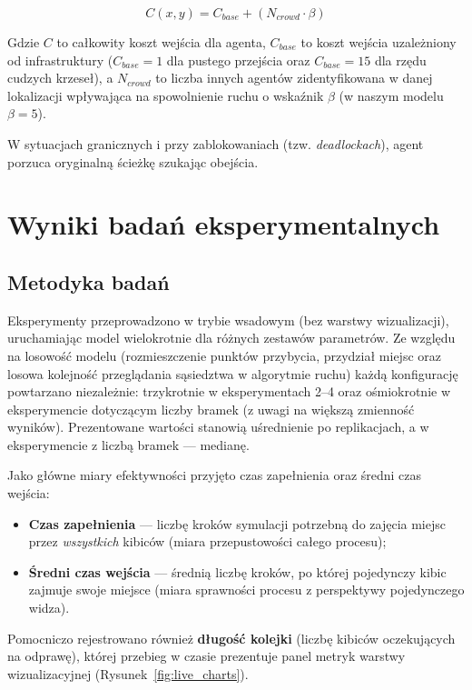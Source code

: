 \documentclass[polish]{projectreport}
\begin{document}
\begin{equation}
    C(x,y) = C_{base} + (N_{crowd} \cdot \beta)
\end{equation}

Gdzie $C$ to całkowity koszt wejścia dla agenta, $C_{base}$ to koszt wejścia uzależniony od infrastruktury ($C_{base} = 1$ dla pustego przejścia oraz $C_{base} = 15$ dla rzędu cudzych krzeseł), a $N_{crowd}$ to liczba innych agentów zidentyfikowana w danej lokalizacji wpływająca na spowolnienie ruchu o wskaźnik $\beta$ (w naszym modelu $\beta = 5$).

W sytuacjach granicznych i przy zablokowaniach (tzw. \textit{deadlockach}), agent porzuca oryginalną ścieżkę szukając obejścia.

\section{Wyniki badań eksperymentalnych}
\label{sec:experiments}

\subsection{Metodyka badań}
Eksperymenty przeprowadzono w trybie wsadowym (bez warstwy wizualizacji), uruchamiając model wielokrotnie dla różnych zestawów parametrów. Ze względu na losowość modelu (rozmieszczenie punktów przybycia, przydział miejsc oraz losowa kolejność przeglądania sąsiedztwa w algorytmie ruchu) każdą konfigurację powtarzano niezależnie: trzykrotnie w eksperymentach 2--4 oraz ośmiokrotnie w eksperymencie dotyczącym liczby bramek (z uwagi na większą zmienność wyników). Prezentowane wartości stanowią uśrednienie po replikacjach, a w eksperymencie z liczbą bramek --- medianę.

Jako główne miary efektywności przyjęto czas zapełnienia oraz średni czas wejścia:
\begin{itemize}
    \item \textbf{Czas zapełnienia} --- liczbę kroków symulacji potrzebną do zajęcia miejsc przez \emph{wszystkich} kibiców (miara przepustowości całego procesu);
    \item \textbf{Średni czas wejścia} --- średnią liczbę kroków, po której pojedynczy kibic zajmuje swoje miejsce (miara sprawności procesu z perspektywy pojedynczego widza).
\end{itemize}
Pomocniczo rejestrowano również \textbf{długość kolejki} (liczbę kibiców oczekujących na odprawę), której przebieg w czasie prezentuje panel metryk warstwy wizualizacyjnej (Rysunek~\ref{fig:live_charts}).
\end{document}
